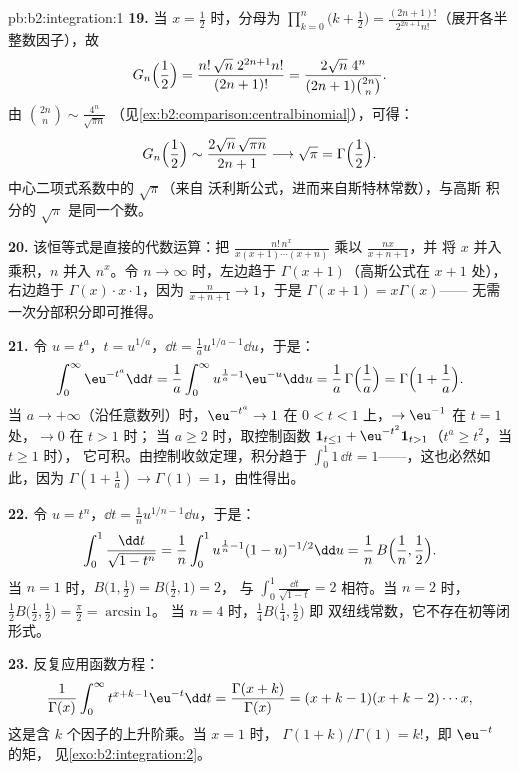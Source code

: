 \begin{solution}{pb:b2:integration:1}
\textbf{19.} 当 $x = \frac12$ 时，分母为
$\prod_{k=0}^n\bigl(k+\frac12\bigr) =
\frac{(2n+1)!}{2^{2n+1}n!}$（展开各半整数因子），故
\[
G_n\Bigl(\frac12\Bigr)
= \frac{n!\,\sqrt n\;2^{2n+1}n!}{(2n+1)!}
= \frac{2\sqrt n\;4^n}{(2n+1)\binom{2n}{n}} .
\]
由 $\binom{2n}{n} \sim \frac{4^n}{\sqrt{\pi n}}$
（见\cref{ex:b2:comparison:centralbinomial}），可得：
\[
G_n\Bigl(\frac12\Bigr)
\sim \frac{2\sqrt n\,\sqrt{\pi n}}{2n+1}
\longrightarrow \sqrt\pi = \Gamma\Bigl(\frac12\Bigr) .
\]
中心二项式系数中的 $\sqrt\pi$（来自
沃利斯公式，进而来自斯特林常数），与高斯
积分的 $\sqrt\pi$ 是同一个数。

\textbf{20.} 该恒等式是直接的代数运算：把
$\frac{n!\,n^x}{x(x+1)\cdots(x+n)}$ 乘以 $\frac{nx}{x+n+1}$，并
将 $x$ 并入乘积，$n$ 并入 $n^x$。令 $n \to
\infty$ 时，左边趋于 $\Gamma(x+1)$（高斯公式在 $x+1$ 处），
右边趋于 $\Gamma(x)\cdot x\cdot 1$，因为
$\frac{n}{x+n+1} \to 1$，于是 $\Gamma(x+1) = x\Gamma(x)$——
无需一次分部积分即可推得。

\textbf{21.} 令 $u = t^a$，$t = u^{1/a}$，$\dd t = \frac1a
u^{1/a - 1}\dd u$，于是：
\[
\int_0^\infty \eu^{-t^a}\dd t
= \frac1a\int_0^\infty u^{\frac1a - 1}\eu^{-u}\dd u
= \frac1a\,\Gamma\Bigl(\frac1a\Bigr)
= \Gamma\Bigl(1 + \frac1a\Bigr) .
\]
当 $a \to +\infty$（沿任意数列）时，$\eu^{-t^a} \to 1$ 在
$0 < t < 1$ 上，$\to \eu^{-1}$ 在 $t = 1$ 处，$\to 0$ 在 $t > 1$ 时；
当 $a \geq 2$ 时，取控制函数 $\mathbf 1_{t \leq 1} +
\eu^{-t^2}\mathbf 1_{t > 1}$（$t^a \geq t^2$，当 $t \geq 1$ 时），
它可积。由控制收敛定理，积分趋于
$\int_0^1 1\,\dd t = 1$——，这也必然如此，因为 $\Gamma(1 +
\frac1a) \to \Gamma(1) = 1$，由性得出。

\textbf{22.} 令 $u = t^n$，$\dd t = \frac1n u^{1/n - 1}\dd
u$，于是：
\[
\int_0^1 \frac{\dd t}{\sqrt{1-t^n}}
= \frac1n\int_0^1 u^{\frac1n-1}(1-u)^{-1/2}\dd u
= \frac1n\,B\Bigl(\frac1n, \frac12\Bigr) .
\]
当 $n = 1$ 时，$B\bigl(1,\frac12\bigr) = B\bigl(\frac12,1\bigr) = 2$，
与 $\int_0^1\frac{\dd t}{\sqrt{1-t}} = 2$ 相符。当 $n = 2$ 时，
$\frac12 B\bigl(\frac12,\frac12\bigr) = \frac\pi2 = \arcsin 1$。
当 $n = 4$ 时，$\frac14 B\bigl(\frac14,\frac12\bigr)$ 即
双纽线常数，它不存在初等闭形式。

\textbf{23.} 反复应用函数方程：
\[
\frac{1}{\Gamma(x)}\int_0^\infty t^{x+k-1}\eu^{-t}\dd t
= \frac{\Gamma(x+k)}{\Gamma(x)}
= (x+k-1)(x+k-2)\cdots x ,
\]
这是含 $k$ 个因子的上升阶乘。当 $x = 1$ 时，
$\Gamma(1+k)/\Gamma(1) = k!$，即 $\eu^{-t}$ 的矩，
见\cref{exo:b2:integration:2}。


\end{solution}
